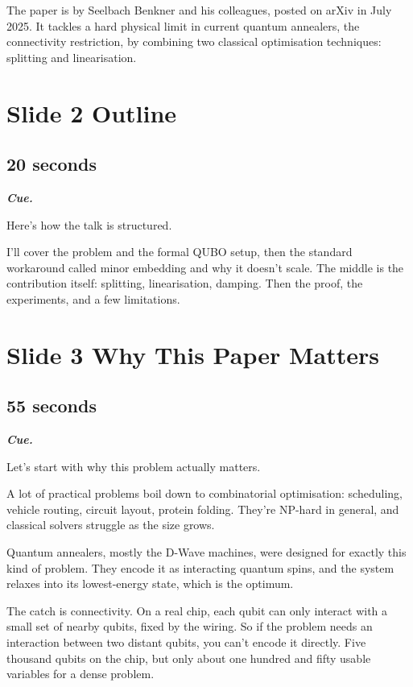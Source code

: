 \documentclass[11pt,a4paper]{article}
\newenvironment{cue}{%
  \par\noindent
  \begin{minipage}{\linewidth}
  \color{muted}\small\itshape
  \textbf{\color{accent}\upshape Cue.}~%
}{%
  \end{minipage}\par\medskip
}
\begin{document}
The paper is by Seelbach Benkner and his colleagues, posted on arXiv in July 2025. It tackles a hard physical limit in current quantum annealers, the connectivity restriction, by combining two classical optimisation techniques: splitting and linearisation.

\section*{Slide 2 \quad Outline}
\subsection*{20 seconds}

\begin{cue}
Here's how the talk is structured.
\end{cue}

I'll cover the problem and the formal QUBO setup, then the standard workaround called minor embedding and why it doesn't scale. The middle is the contribution itself: splitting, linearisation, damping. Then the proof, the experiments, and a few limitations.

\section*{Slide 3 \quad Why This Paper Matters}
\subsection*{55 seconds}

\begin{cue}
Let's start with why this problem actually matters.
\end{cue}

A lot of practical problems boil down to combinatorial optimisation: scheduling, vehicle routing, circuit layout, protein folding. They're NP-hard in general, and classical solvers struggle as the size grows.

Quantum annealers, mostly the D-Wave machines, were designed for exactly this kind of problem. They encode it as interacting quantum spins, and the system relaxes into its lowest-energy state, which is the optimum.

The catch is connectivity. On a real chip, each qubit can only interact with a small set of nearby qubits, fixed by the wiring. So if the problem needs an interaction between two distant qubits, you can't encode it directly. Five thousand qubits on the chip, but only about one hundred and fifty usable variables for a dense problem.
\end{document}
